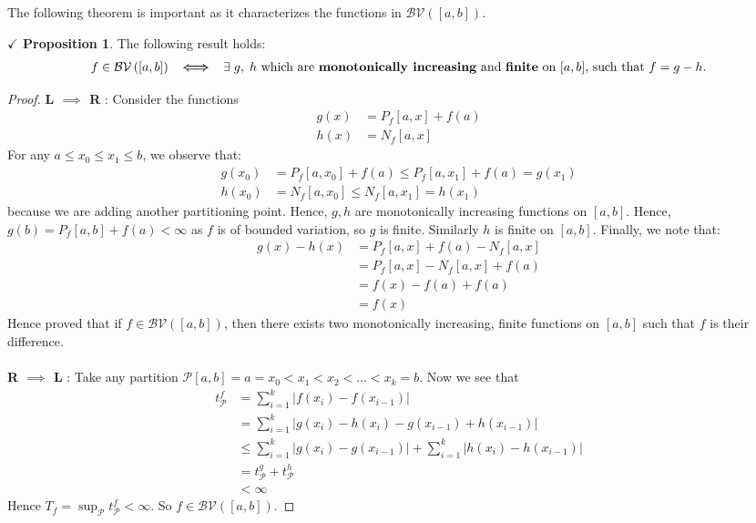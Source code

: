 \documentclass{article}
\theoremstyle{definition}
\theoremstyle{remark}
\theoremstyle{definition}
\theoremstyle{definition}
\newtheorem{proposition}{$\checkmark$ Proposition}
\theoremstyle{definition}
\newcommand{\abs}[1]{\left \vert #1\right \vert}
\newcommand{\bv}[1]{\mathcal{BV}\left (#1\right )}
\begin{document}
The following theorem is important as it characterizes the functions in $ \bv{[a,b]} $.
\begin{proposition} \label{P-46}
	The following result holds:
	\begin{align*}
		f\in \bv{[a,b]} \;\;\bm{\iff}\;\; \exists \;g,\;h\text{ which are \textbf{monotonically increasing} and \textbf{finite} on $ [a,b] $, such that } f = g-h.   
	\end{align*}
\end{proposition}
\begin{proof}
	\textbf{ L $ \implies $ R} : Consider the functions 
	\begin{align*}
		g(x) &= P_f[a,x] + f(a)\\
		h(x) &= N_f[a,x]
 	\end{align*}
 For any $ a\le x_0  \le x_1 \le b $, we observe that:
 \begin{align*}
 	g(x_0) &= P_f[a,x_0] + f(a) \le P_f[a,x_1] + f(a) = g(x_1)\\
 	h(x_0) &= N_f[a,x_0] \le N_f[a,x_1] = h(x_1)
 \end{align*}
because we are adding another partitioning point. Hence, $ g,h $ are monotonically increasing functions on $ [a,b] $. Hence, $ g(b) = P_f[a,b] + f(a) < \infty$ as $ f $ is of bounded variation, so $ g $ is finite. Similarly $ h $ is finite on $ [a,b] $. Finally, we note that:
\begin{align*}
	g(x) - h(x) &= P_f[a,x] + f(a) - N_f[a,x]\\
	&= P_f[a,x] - N_f[a,x] + f(a)\\
	&= f(x) - f(a) + f(a)\\
	&= f(x) 
\end{align*}
Hence proved that if $ f \in \bv{[a,b]}$, then there exists two monotonically increasing, finite functions on $ [a,b] $ such that $ f $ is their difference.\\\\
\textbf{R $ \implies $ L} : Take any partition $ \mathcal{P}[a,b] = a = x_0 < x_1 < x_2 < \dots <  x_k = b $. Now we see that
\begin{align*}
	t^{f}_\mathcal{P} &= \sum_{i=1}^{k} \abs{f(x_i) - f(x_{i-1})} \\
	&= \sum_{i=1}^{k} \abs{g(x_i) - h(x_i) - g(x_{i-1}) + h(x_{i-1})} \\
	&\le \sum_{i=1}^{k} \abs{g(x_i) - g(x_{i-1})} + \sum_{i=1}^{k}\abs{h(x_{i}) - h(x_{i-1})}\\
	&= t^{g}_{\mathcal{P}} + t^{h}_{\mathcal{P}}\\
	&< \infty
\end{align*}
Hence $ T_f = \sup_{\mathcal{P}} t^{f}_{\mathcal{P}} < \infty$. So $ f\in \bv{[a,b]} $.
\end{proof}
\hrulefill
\end{document}

